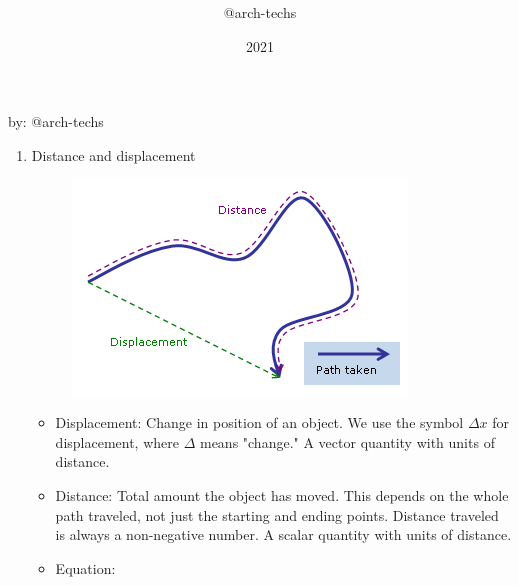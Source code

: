 \documentclass[12pt,a4paper]{report}
\title{\framebox {
        \textcolor{TEcolor}{
            \Huge {    AP/College Physics 1    }
        }
    }    }
\author{\Large @arch-techs}
\date{2021}
\begin{document}
{\selectfont
\begin{titlepage}
\maketitle
\end{titlepage}
\newpage

\begin{center}
    \begin{center}
    \end{center}
    
    \vspace{5mm}
    
    by: @arch-techs
    
    \vspace{1cm}
    
    \begin{enumerate}
        \item Distance and displacement
            \begin{figure}[h]
                \centering
                \includegraphics[scale=0.7]{Distancedisplacement}
                \label{fig:my_label}
            \end{figure}
            \begin{itemize}
                \item Displacement: Change in position of an object. We use the symbol $\Delta x$ for displacement, where $\Delta$ means "change." A vector quantity with units of distance.
                \item Distance: Total amount the object has moved. This depends on the whole path traveled, not just the starting and ending points. Distance traveled is always a non-negative number. A scalar quantity with units of distance.
                \item Equation: \newline
                

\end{itemize}
\end{enumerate}
\end{center}}
\end{document}
